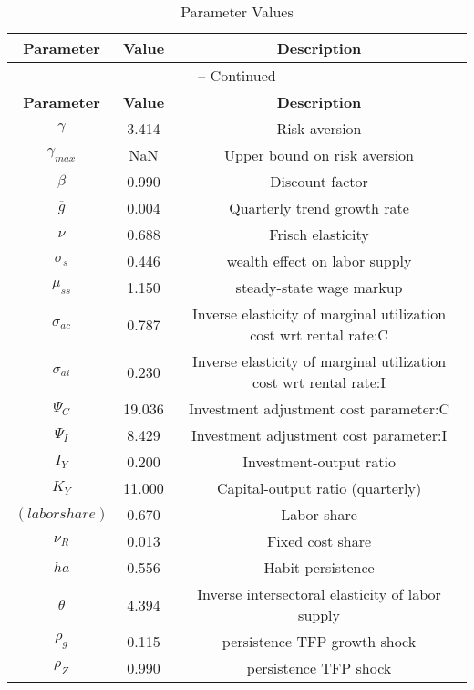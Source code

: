 \begin{center}
\begin{longtable}{ccc}
\caption{Parameter Values}\\%
\toprule%
\multicolumn{1}{c}{\textbf{Parameter}} &
\multicolumn{1}{c}{\textbf{Value}} &
 \multicolumn{1}{c}{\textbf{Description}}\\%
\midrule%
\endfirsthead
\multicolumn{3}{c}{{\tablename} \thetable{} -- Continued}\\%
\midrule%
\multicolumn{1}{c}{\textbf{Parameter}} &
\multicolumn{1}{c}{\textbf{Value}} &
  \multicolumn{1}{c}{\textbf{Description}}\\%
\midrule%
\endhead
${\gamma}$ 	 & 	 3.414 	 & 	 Risk aversion\\
${\gamma_{max}}$ 	 & 	  NaN 	 & 	 Upper bound on risk aversion\\
${\beta}$ 	 & 	 0.990 	 & 	 Discount factor\\
${\overline{g}}$ 	 & 	 0.004 	 & 	 Quarterly trend growth rate\\
$\nu$ 	 & 	 0.688 	 & 	 Frisch elasticity\\
$\sigma_s$ 	 & 	 0.446 	 & 	 wealth effect on labor supply\\
$\mu_{ss}$ 	 & 	 1.150 	 & 	 steady-state wage markup\\
${\sigma_{ac}}$ 	 & 	 0.787 	 & 	 Inverse elasticity of marginal utilization cost wrt rental rate:C\\
${\sigma_{ai}}$ 	 & 	 0.230 	 & 	 Inverse elasticity of marginal utilization cost wrt rental rate:I\\
${\Psi_C}$ 	 & 	 19.036 	 & 	 Investment adjustment cost parameter:C\\
${\Psi_I}$ 	 & 	 8.429 	 & 	 Investment adjustment cost parameter:I\\
${I_Y}$ 	 & 	 0.200 	 & 	 Investment-output ratio\\
${K_Y}$ 	 & 	 11.000 	 & 	 Capital-output ratio (quarterly)\\
$(labor share)$ 	 & 	 0.670 	 & 	 Labor share\\
${\nu_R}$ 	 & 	 0.013 	 & 	 Fixed cost share\\
${ha}$ 	 & 	 0.556 	 & 	 Habit persistence\\
${\theta}$ 	 & 	 4.394 	 & 	 Inverse intersectoral elasticity of labor supply\\
${\rho_g}$ 	 & 	 0.115 	 & 	 persistence TFP growth shock\\
${\rho_Z}$ 	 & 	 0.990 	 & 	 persistence TFP shock\\

\end{longtable}
\end{center}
